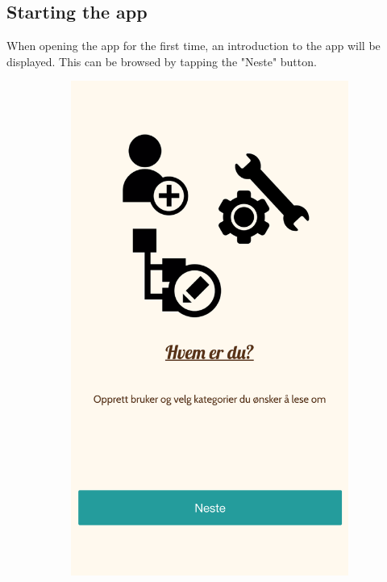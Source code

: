 \begin{appendices}
\section{Starting the app}
When opening the app for the first time, an introduction to the app will be displayed. This can be browsed by tapping the "Neste" button. 
\begin{figure}[h!]
		\centering
		\begin{subfigure}[h]{0.32\textwidth}
			\includegraphics[width=\textwidth]{fig/screenshot_intro1}

\end{subfigure}
\end{figure}
\end{appendices}

